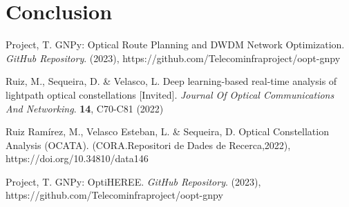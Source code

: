\documentclass[lettersize,journal, one-column]{IEEEtran}
\begin{document}
\section{Conclusion}
\label{section:conclusion}


\begin{thebibliography}{1}


Project, T. GNPy: Optical Route Planning and DWDM Network Optimization. {\em GitHub Repository}. (2023), https://github.com/Telecominfraproject/oopt-gnpy

Ruiz, M., Sequeira, D. \& Velasco, L. Deep learning-based real-time analysis of lightpath optical constellations [Invited]. {\em Journal Of Optical Communications And Networking}. \textbf{14}, C70-C81 (2022)

Ruiz Ramírez, M., Velasco Esteban, L. \& Sequeira, D. Optical Constellation Analysis (OCATA). (CORA.Repositori de Dades de Recerca,2022), https://doi.org/10.34810/data146

Project, T. GNPy: OptiHEREE. {\em GitHub Repository}. (2023), https://github.com/Telecominfraproject/oopt-gnpy




\end{thebibliography}
\end{document}
